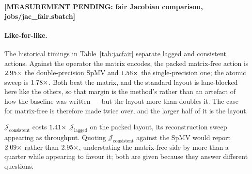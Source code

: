 \documentclass[sigconf,nonacm]{acmart}
\newcommand{\inputifready}[2]{%
  \IfFileExists{#1.tex}{}%
    {\textbf{[MEASUREMENT PENDING: #2]}}}
\newcommand{\Jlag}{\mathcal{J}_{\mathrm{lagged}}}
\newcommand{\Jex}{\mathcal{J}_{\mathrm{consistent}}}
\newcommand{\Jhoex}{\mathcal{J}^{\mathrm{ho}}_{\mathrm{consistent}}}
\begin{document}
\begin{table}[t]
  \centering
  \caption{The Jacobian action, each form fully consistent or fully lagged, on the three matrix-free
    layouts against the double-precision product (the \texttt{f64} row, which the ratios divide
    by and which has no layout of its own). \emph{col.} is the \emph{element}-coloured layout,
    not the pack colouring; it reads the standard mesh as \emph{standard} does but changes
    accumulation, traversal order and synchronization together. $\Jlag$ is one row because deferred correction leaves the implicit
    operator scheme-independent by construction: the first-order row \emph{is} the lagged action,
    and a control at every limiter reproduces its result bit for bit. It is also the only form encoded by the
    matrix in this historical table; its $\Jhoex$ rows have no measured matrix counterpart. The limiters are the
    cheapest and among the dearest, so they bracket what one costs. The \texttt{f32} group is the
    single-precision build in the same allocation, against its own SpMV, whose matrix and vectors
    are both float. Consistent-action rows are historical rebuild-mode measurements;
    they do not measure the new cached-state benchmark.}
  \label{tab:jacfair}
  \inputifready{tables/jacfair}{fair Jacobian comparison, jobs/jac\_fair.sbatch}
\end{table}

\paragraph{Like-for-like.} The historical timings in Table~\ref{tab:jacfair}
separate lagged and consistent actions. Against the operator the matrix encodes, the packed matrix-free action is
$2.95\times$ the double-precision SpMV and $1.56\times$ the single-precision one;
the atomic sweep is $1.78\times$. Both beat the matrix, and the standard layout is
lane-blocked here like the others, so that margin is the method's rather than an artefact of how
the baseline was written --- but the layout more than doubles it. The case for matrix-free is
therefore made twice over, and the larger half of it is the layout.

$\Jex$ costs $1.41\times$ $\Jlag$ on the packed layout, its reconstruction sweep
appearing as throughput. Quoting $\Jex$ against the SpMV would report $2.09\times$ rather
than $2.95\times$, understating the matrix-free side by more than a quarter while
appearing to favour it; both are given because they answer different questions.
\end{document}
